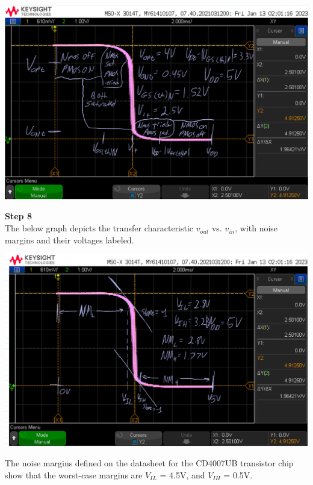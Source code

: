 \documentclass[notitlepage, 12pt]{report}  %
\begin{document}
\begin{center}
    \includegraphics[scale=0.4]{scope3.png}
\end{center}

\vspace{7pt}

\newpage

\textbf{Step 8}\\

The below graph depicts the transfer characteristic ${v_{out}}$ vs. $v_{in}$, with noise margins and their voltages
labeled.\\

\begin{center}
    \includegraphics[scale=0.4]{scope4.png}
\end{center}

The noise margins defined on the datasheet for the CD4007UB transistor chip show that the worst-case margins 
are $V_{IL}$ = 4.5V, and $V_{IH}$ = 0.5V.\\
\end{document}
